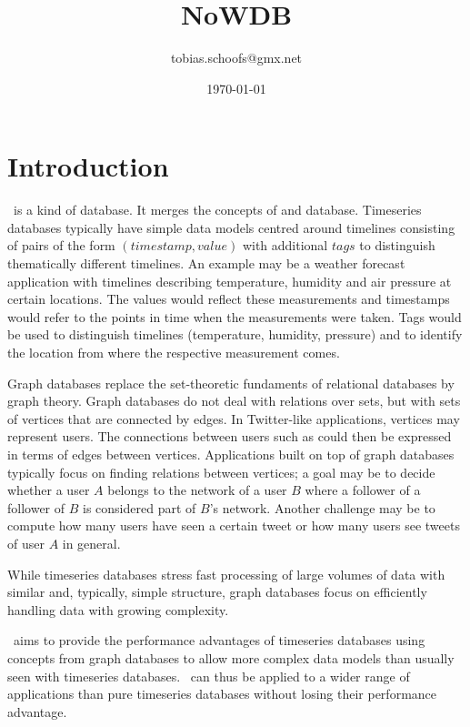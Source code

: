 \documentclass{scrreprt}
\begin{document}
\setlength{\parindent}{0pt}
\setlength{\parskip}{8pt}

\title {NoWDB}
\author {tobias.schoofs@gmx.net}
\date{\today}
\maketitle
\tableofcontents

\chapter{Introduction}\label{chpt_intro} 
\nowdb\ is a kind of database.
It merges the concepts
of  and  database.
Timeseries databases typically have simple
data models centred around timelines
consisting of pairs of the form
$(timestamp,value)$
with additional $tags$ to
distinguish thematically different timelines.
An example may be a weather forecast
application with timelines describing
temperature, humidity and air pressure
at certain locations. The values would
reflect these measurements and timestamps
would refer to the points in time when
the measurements were taken. Tags would
be used to distinguish timelines
(temperature, humidity, pressure) and
to identify the location from where the
respective measurement comes.

Graph databases replace the set-theoretic
fundaments of relational databases by
graph theory. Graph databases do not deal
with relations over sets, but with
sets of vertices that are connected
by edges. In Twitter-like applications,
vertices may represent users.
The connections between users such as
 could then be expressed
in terms of edges between vertices.
Applications built on top of graph databases
typically focus on finding relations
between vertices; a goal may be to decide
whether a user $A$ belongs to the network
of a user $B$ where a follower of a
follower of $B$ is considered part of
$B$'s network. Another challenge may be
to compute how many users have seen
a certain tweet or how many users
see tweets of user $A$ in general.

While timeseries databases stress
fast processing of large volumes of
data with similar and, typically, simple structure,
graph databases focus on efficiently handling
data with growing complexity.

\nowdb\ aims to provide the
performance advantages of timeseries databases
using concepts from graph databases
to allow more complex data models
than usually seen with timeseries databases.
\nowdb\ can thus be applied to a wider
range of applications than pure
timeseries databases without losing
their performance advantage.
\end{document}
